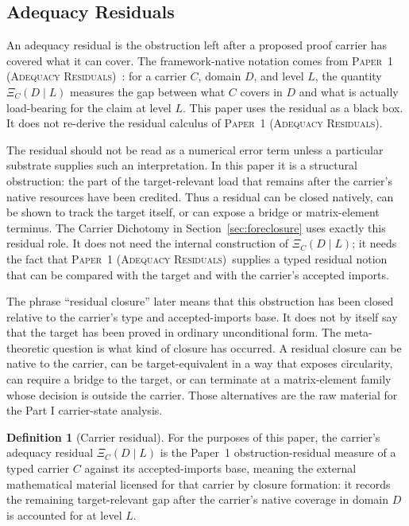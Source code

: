 \documentclass[11pt]{article}
\newcommand{\PaperAdequacy}{\textsc{Paper~1 (Adequacy Residuals)}}
\theoremstyle{definition}
\newtheorem{definition}[theorem]{Definition}
\begin{document}
\subsection{Adequacy Residuals}\label{sec:apparatus:adequacy-residual}

An adequacy residual is the obstruction left after a proposed proof
carrier has covered what it can cover.  The framework-native notation
comes from \PaperAdequacy\ \cite{Tsiokos2026XiCompanion}: for a
carrier \(C\), domain \(D\), and level \(L\), the quantity
\(\Xi_C(D\mid L)\) measures the gap between what \(C\) covers in
\(D\) and what is actually load-bearing for the claim at level \(L\).
This paper uses the residual as a black box.  It does not re-derive
the residual calculus of \PaperAdequacy.

The residual should not be read as a numerical error term unless a
particular substrate supplies such an interpretation.  In this paper
it is a structural obstruction: the part of the target-relevant load
that remains after the carrier's native resources have been credited.
Thus a residual can be closed natively, can be shown to track the
target itself, or can expose a bridge or matrix-element terminus.  The
Carrier Dichotomy in Section~\ref{sec:foreclosure} uses exactly this
residual role.  It does not need the internal construction of
\(\Xi_C(D\mid L)\); it needs the fact that \PaperAdequacy\ supplies a
typed residual notion that can be compared with the target and with
the carrier's accepted imports.

The phrase ``residual closure'' later means that this obstruction has
been closed relative to the carrier's type and accepted-imports base.
It does not by itself say that the target has been proved in ordinary
unconditional form.  The meta-theoretic question is what kind of
closure has occurred.  A residual closure can be native to the carrier,
can be target-equivalent in a way that exposes circularity, can require
a bridge to the target, or can terminate at a matrix-element family
whose decision is outside the carrier.  Those alternatives are the raw
material for the Part I carrier-state analysis.

\begin{definition}[Carrier residual]\label{def:carrier-residual}
For the purposes of this paper, the carrier's adequacy residual
\(\Xi_C(D\mid L)\) is the Paper~1 obstruction-residual measure of a
typed carrier \(C\) against its accepted-imports base, meaning the
external mathematical material licensed for that carrier by closure
formation: it records the remaining target-relevant gap after the
carrier's native coverage in domain \(D\) is accounted for at level
\(L\).
\end{definition}
\end{document}
